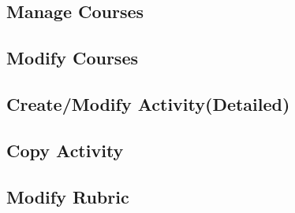 \documentclass{article}
\begin{document}
\subsection{Manage Courses}

\subsection{Modify Courses}

\subsection{Create/Modify Activity(Detailed)}

\subsection{Copy Activity}

\subsection{Modify Rubric}
\end{document}
